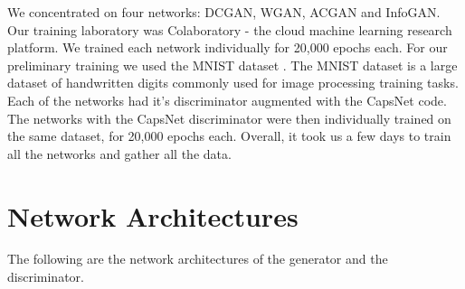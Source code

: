 We concentrated on four networks: DCGAN, WGAN, ACGAN and InfoGAN. Our training laboratory was Colaboratory - the cloud machine learning research platform. We trained each network individually for 20,000 epochs each. For our preliminary training we used the MNIST dataset \cite{mnist}. The MNIST dataset is a large dataset of handwritten digits commonly used for image processing training tasks. Each of the networks had it's discriminator augmented with the CapsNet code. The networks with the CapsNet discriminator were then individually trained on the same dataset, for 20,000 epochs each. Overall, it took us a few days to train all the networks and gather all the data.
\par\bigskip

\section{Network Architectures} %
\label{sec:network_architectures}
The following are the network architectures of the generator and the discriminator.

